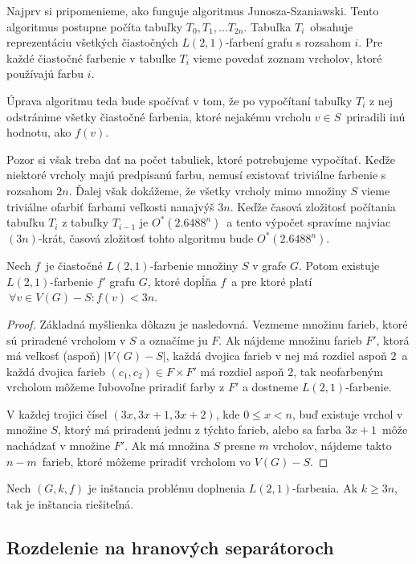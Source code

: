 Najprv si pripomenieme, ako funguje algoritmus Junosza-Szaniawski.
Tento algoritmus postupne počíta tabuľky $T_0, T_1, \ldots T_{2n}$.
Tabuľka $T_i$ obsahuje reprezentáciu všetkých čiastočných $L(2,1)$-farbení grafu s rozsahom $i$. Pre každé
čiastočné farbenie v tabuľke $T_i$ vieme povedať zoznam vrcholov, ktoré používajú farbu $i$.

Úprava algoritmu teda bude spočívať v tom, že po vypočítaní tabuľky $T_i$ z nej odstránime
všetky čiastočné farbenia, ktoré nejakému vrcholu $v \in S$ priradili inú hodnotu, ako $f(v)$.

Pozor si však treba dať na počet tabuliek, ktoré potrebujeme vypočítať. Keďže niektoré vrcholy
majú predpísanú farbu, nemusí existovať triviálne farbenie s rozsahom $2n$. Ďalej však dokážeme,
že všetky vrcholy mimo množiny $S$ vieme triviálne ofarbiť farbami veľkosti nanajvýš $3n$. Keďže
časová zložitosť počítania tabuľku $T_i$ z tabuľky $T_{i-1}$ je $O^*(2.6488^n)$ a tento výpočet
spravíme najviac $(3n)$-krát, časová zložitosť tohto algoritmu bude $O^*(2.6488^n)$.

\begin{lema}
    Nech $f$ je čiastočné $L(2,1)$-farbenie množiny $S$ v grafe $G$. Potom existuje
    $L(2,1)$-farbenie $f'$ grafu $G$, ktoré dopĺňa $f$ a pre ktoré platí $\ \forall v \in V(G) - S: f(v) < 3n$.
\end{lema}
\begin{proof}
    Základná myšlienka dôkazu je nasledovná. Vezmeme množinu farieb, ktoré sú priradené vrcholom v $S$
    a označíme ju $F$. Ak nájdeme množinu farieb $F'$, ktorá má veľkosť (aspoň) $|V(G) - S|$,
    každá dvojica farieb v nej má rozdiel aspoň $2$ a každá dvojica farieb $(c_1, c_2) \in F \times F'$ má
    rozdiel aspoň $2$, tak neofarbeným vrcholom môžeme ľubovoľne priradiť farby z $F'$ a dostneme
    $L(2,1)$-farbenie.

    V každej trojici čísel $(3x, 3x + 1, 3x+2)$, kde $0 \leq x < n$, buď existuje vrchol
    v množine $S$, ktorý má priradenú jednu z týchto farieb, alebo sa farba $3x + 1$ môže nachádzať v
    množine $F'$. Ak má množina $S$ presne $m$ vrcholov, nájdeme takto $n - m$ farieb, ktoré
    môžeme priradiť vrcholom vo $V(G) - S$.
\end{proof}
\begin{dosl}
    Nech $(G, k, f)$ je inštancia problému doplnenia $L(2,1)$-farbenia. Ak $k \ge 3n$, tak
    je inštancia riešiteľná.
\end{dosl}

\subsection{Rozdelenie na hranových separátoroch}

